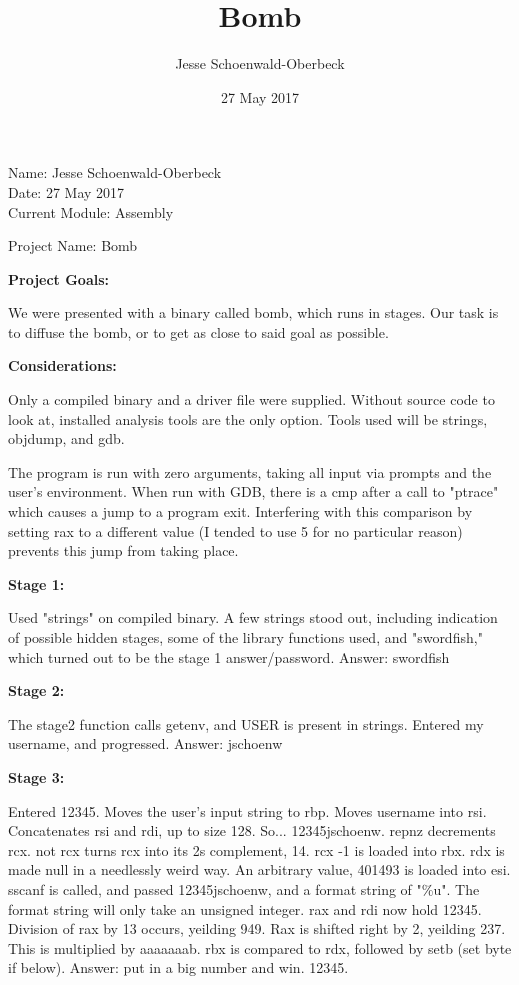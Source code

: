 \documentclass{article}
\title{Bomb}
\author{Jesse Schoenwald-Oberbeck}
\date{27 May 2017}
\begin{document}
    Name: Jesse Schoenwald-Oberbeck \\
    Date: 27 May 2017 \\
    Current Module: Assembly

    Project Name: Bomb
    \bigskip

    \textbf{Project Goals:}

    We were presented with a binary called bomb, which runs in stages. Our task is to diffuse the bomb, or to get as close to said goal as possible.
    \bigskip

    \textbf{Considerations:}

    Only a compiled binary and a driver file were supplied. Without source code to look at, installed analysis tools are the only option. Tools used will be strings, objdump, and gdb.

    \bigskip

    The program is run with zero arguments, taking all input via prompts and the user's environment.
    When run with GDB, there is a cmp after a call to "ptrace" which causes a jump to a program exit. Interfering with this comparison by setting rax to a different value (I tended to use 5 for no particular reason) prevents this jump from taking place.

    \bigskip

    \textbf{Stage 1:}

    \bigskip
	Used "strings" on compiled binary. A few strings stood out, including indication of possible hidden stages, some of the library functions used, and "swordfish," which turned out to be the stage 1 answer/password.
	Answer: swordfish

    \bigskip

    \textbf{Stage 2:}

    \bigskip

	The stage2 function calls getenv, and USER is present in strings. Entered my username, and progressed.
	Answer: jschoenw

    \bigskip

    \textbf{Stage 3:}

    \bigskip

    Entered 12345.
    Moves the user's input string to rbp. Moves username into rsi. Concatenates rsi and rdi, up to size 128. So... 12345jschoenw.
    repnz decrements rcx. not rcx turns rcx into its 2s complement, 14.
    rcx -1 is loaded into rbx. rdx is made null in a needlessly weird way.
    An arbitrary value, 401493 is loaded into esi.
    sscanf is called, and passed 12345jschoenw, and a format string of "\%u".
    The format string will only take an unsigned integer.
    rax and rdi now hold 12345.
    Division of rax by 13 occurs, yeilding 949.
    Rax is shifted right by 2, yeilding 237.
    This is multiplied by aaaaaaab.
    rbx is compared to rdx, followed by setb (set byte if below).
    Answer: put in a big number and win. 12345.
\end{document}
